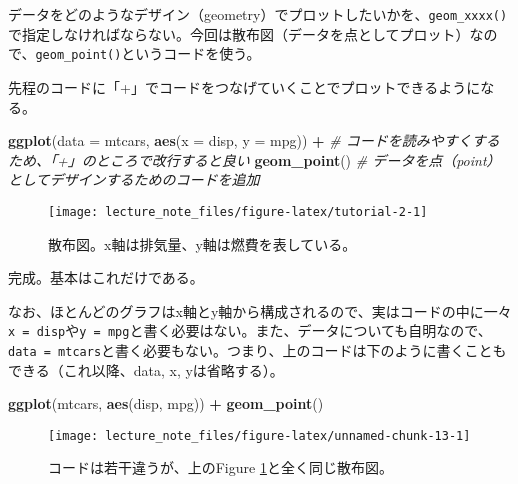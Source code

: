 \documentclass[]{book}
\newenvironment{Shaded}{\begin{snugshade}}{\end{snugshade}}
\newcommand{\KeywordTok}[1]{\textcolor[rgb]{0.13,0.29,0.53}{\textbf{#1}}}
\newcommand{\DataTypeTok}[1]{\textcolor[rgb]{0.13,0.29,0.53}{#1}}
\newcommand{\StringTok}[1]{\textcolor[rgb]{0.31,0.60,0.02}{#1}}
\newcommand{\CommentTok}[1]{\textcolor[rgb]{0.56,0.35,0.01}{\textit{#1}}}
\newcommand{\OperatorTok}[1]{\textcolor[rgb]{0.81,0.36,0.00}{\textbf{#1}}}
\newcommand{\NormalTok}[1]{#1}
\begin{document}
データをどのようなデザイン（geometry）でプロットしたいかを、\texttt{geom\_xxxx()}で指定しなければならない。今回は散布図（データを点としてプロット）なので、\texttt{geom\_point()}というコードを使う。

先程のコードに「+」でコードをつなげていくことでプロットできるようになる。



\begin{Shaded}
\begin{Highlighting}[]
\KeywordTok{ggplot}\NormalTok{(}\DataTypeTok{data =}\NormalTok{ mtcars, }\KeywordTok{aes}\NormalTok{(}\DataTypeTok{x =}\NormalTok{ disp, }\DataTypeTok{y =}\NormalTok{ mpg)) }\OperatorTok{+}\StringTok{ }\CommentTok{# コードを読みやすくするため、「+」のところで改行すると良い}
\StringTok{  }\KeywordTok{geom_point}\NormalTok{() }\CommentTok{# データを点（point）としてデザインするためのコードを追加}
\end{Highlighting}
\end{Shaded}

\begin{figure}

{\centering \texttt{[image: lecture\_note\_files/figure-latex/tutorial-2-1]} 

}

\caption{散布図。x軸は排気量、y軸は燃費を表している。}\label{fig:tutorial-2}
\end{figure}

完成。基本はこれだけである。

なお、ほとんどのグラフはx軸とy軸から構成されるので、実はコードの中に一々\texttt{x\ =\ disp}や\texttt{y\ =\ mpg}と書く必要はない。また、データについても自明なので、\texttt{data\ =\ mtcars}と書く必要もない。つまり、上のコードは下のように書くこともできる（これ以降、data,
x, yは省略する）。




\begin{Shaded}
\begin{Highlighting}[]
\KeywordTok{ggplot}\NormalTok{(mtcars, }\KeywordTok{aes}\NormalTok{(disp, mpg)) }\OperatorTok{+}
\StringTok{  }\KeywordTok{geom_point}\NormalTok{()}
\end{Highlighting}
\end{Shaded}

\begin{figure}

{\centering \texttt{[image: lecture\_note\_files/figure-latex/unnamed-chunk-13-1]} 

}

\caption{コードは若干違うが、上のFigure
\ref{fig:tutorial-2}と全く同じ散布図。}\label{fig:unnamed-chunk-13}
\end{figure}
\end{document}
